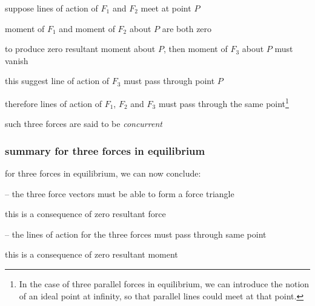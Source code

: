 suppose lines of action of $F_1$ and $F_2$ meet at point $P$

moment of $F_1$ and moment of $F_2$ about $P$ are both zero

to produce zero resultant moment about $P$, then moment of $F_3$ about $P$ must vanish

this suggest line of action of $F_3$ must pass through point $P$

therefore lines of action of $F_1$, $F_2$ and $F_3$ must pass through the same point\footnote{In the case of three parallel forces in equilibrium, we can introduce the notion of an ideal point at infinity, so that parallel lines could meet at that point.}

such three forces are said to be \emph{concurrent}

\subsubsection*{summary for three forces in equilibrium}

for three forces in equilibrium, we can now conclude:

\begin{compactenum}
	\item[--] the three force vectors must be able to form a force triangle
	
	this is a consequence of zero resultant force
	
	\item[--] the lines of action for the three forces must pass through same point
	
	this is a consequence of zero resultant moment
\end{compactenum}





